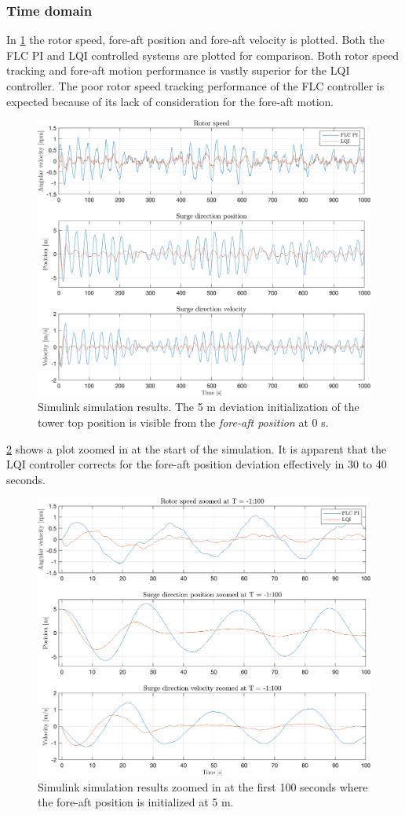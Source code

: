 \clearpage
\subsubsection{Time domain}
In \cref{fig:app_sim_11_W_py_vy_comp} the rotor speed, fore-aft position and fore-aft velocity is plotted. Both the FLC PI and LQI controlled systems are plotted for comparison. Both rotor speed tracking and fore-aft motion performance is vastly superior for the LQI controller. The poor rotor speed tracking performance of the FLC controller is expected because of its lack of consideration for the fore-aft motion.
\begin{figure}[ht]
	\centering
	\includegraphics[width=0.7\linewidth]{Graphics/TestResults/linearModPerf/sim_11_W_py_vy_comp.png}
	\caption{Simulink simulation results. The 5 m deviation initialization of the tower top position is visible from the \textit{fore-aft position} at 0 s.}
	\label{fig:app_sim_11_W_py_vy_comp}
\end{figure}
\cref{fig:app_sim_12_W_py_vy_comp_zoom} shows a plot zoomed in at the start of the simulation. It is apparent that the LQI controller corrects for the fore-aft position deviation effectively in 30 to 40 seconds.
\begin{figure}[ht]
	\centering
	\includegraphics[width=0.7\linewidth]{Graphics/TestResults/linearModPerf/sim_12_W_py_vy_comp_zoom.png}
	\caption{Simulink simulation results zoomed in at the first 100 seconds where the fore-aft position is initialized at 5 m.}
	\label{fig:app_sim_12_W_py_vy_comp_zoom}
\end{figure}

